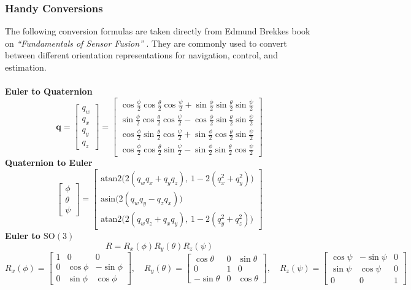 \subsubsection{Handy Conversions}
The following conversion formulas are taken directly from Edmund Brekkes book on \textit{``Fundamentals of Sensor Fusion''} \cite{sensor_fusion_book}. They are commonly used to convert between different orientation representations for navigation, control, and estimation.
\\ \\
\textbf{Euler to Quaternion}
$$
    \mathbf{q} =
    \begin{bmatrix}
        q_w \\ q_x \\ q_y \\ q_z
    \end{bmatrix}
    =
    \begin{bmatrix}
        \cos\frac{\phi}{2}\cos\frac{\theta}{2}\cos\frac{\psi}{2} + \sin\frac{\phi}{2}\sin\frac{\theta}{2}\sin\frac{\psi}{2} \\
        \sin\frac{\phi}{2}\cos\frac{\theta}{2}\cos\frac{\psi}{2} - \cos\frac{\phi}{2}\sin\frac{\theta}{2}\sin\frac{\psi}{2} \\
        \cos\frac{\phi}{2}\sin\frac{\theta}{2}\cos\frac{\psi}{2} + \sin\frac{\phi}{2}\cos\frac{\theta}{2}\sin\frac{\psi}{2} \\
        \cos\frac{\phi}{2}\cos\frac{\theta}{2}\sin\frac{\psi}{2} - \sin\frac{\phi}{2}\sin\frac{\theta}{2}\cos\frac{\psi}{2}
    \end{bmatrix}
$$
\textbf{Quaternion to Euler}
$$
    \begin{bmatrix}
        \phi \\ \theta \\ \psi
    \end{bmatrix}
    =
    \begin{bmatrix}
        \text{atan2}\big(2(q_w q_x + q_y q_z),\, 1 - 2(q_x^2 + q_y^2)\big) \\
        \text{asin}\big(2(q_w q_y - q_z q_x)\big) \\
        \text{atan2}\big(2(q_w q_z + q_x q_y),\, 1 - 2(q_y^2 + q_z^2)\big)
    \end{bmatrix}
$$
\textbf{Euler to $\mathrm{SO}(3)$}
$$
    R = R_x(\phi) R_y(\theta) R_z(\psi)
$$
$$
    R_x(\phi) =
    \begin{bmatrix}
        1 & 0 & 0 \\
        0 & \cos\phi & -\sin\phi \\
        0 & \sin\phi & \cos\phi
    \end{bmatrix}, \quad
    R_y(\theta) =
    \begin{bmatrix}
        \cos\theta & 0 & \sin\theta \\
        0 & 1 & 0 \\
        -\sin\theta & 0 & \cos\theta
    \end{bmatrix}, \quad
    R_z(\psi) =
    \begin{bmatrix}
        \cos\psi & -\sin\psi & 0 \\
        \sin\psi & \cos\psi & 0 \\
        0 & 0 & 1
    \end{bmatrix}
$$
